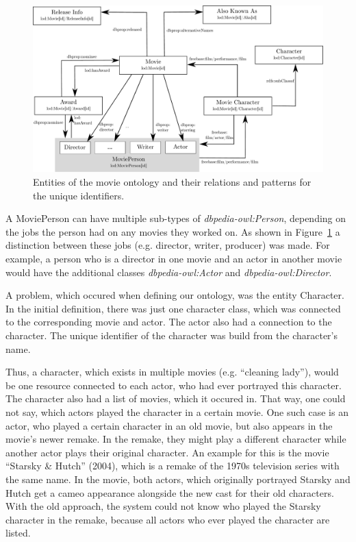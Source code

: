 \begin{figure}[h!]
\includegraphics[width=\textwidth]{images/ontology.pdf}
\caption{Entities of the movie ontology and their relations and patterns for the unique identifiers.}
\label{fig_ontology}
\end{figure}

A MoviePerson can have multiple sub-types of \textit{dbpedia-owl:Person}, depending on the jobs the person had on any movies they worked on.
As shown in Figure~\ref{fig_ontology} a distinction between these jobs (e.g. director, writer, producer) was made.
For example, a person who is a director in one movie and an actor in another movie would have the additional classes \textit{dbpedia-owl:Actor} and \textit{dbpedia-owl:Director}.

A problem, which occured when defining our ontology, was the entity Character.
In the initial definition, there was just one character class, which was connected to the corresponding movie and actor.
The actor also had a connection to the character.
The unique identifier of the character was build from the character's name.

Thus, a character, which exists in multiple movies (e.g. ``cleaning lady''), would be one resource connected to each actor, who had ever portrayed this character.
The character also had a list of movies, which it occured in.
That way, one could not say, which actors played the character in a certain movie.
One such case is an actor, who played a certain character in an old movie, but also appears in the movie's newer remake.
In the remake, they might play a different character while another actor plays their original character.
An example for this is the movie ``Starsky \& Hutch'' (2004), which is a remake of the 1970s television series with the same name.
In the movie, both actors, which originally portrayed Starsky and Hutch get a cameo appearance alongside the new cast for their old characters.
With the old approach, the system could not know who played the Starsky character in the remake, because all actors who ever played the character are listed.

